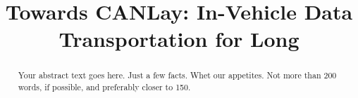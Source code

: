 \documentclass[letterpaper,twocolumn,12pt]{article}
\begin{document}

\date{}

\title{\Large \bf Towards CANLay: In-Vehicle Data Transportation for Long}


\maketitle

\begin{abstract}
Your abstract text goes here. Just a few facts. Whet our appetites.
Not more than 200 words, if possible, and preferably closer to 150.
\end{abstract}
\end{document}
